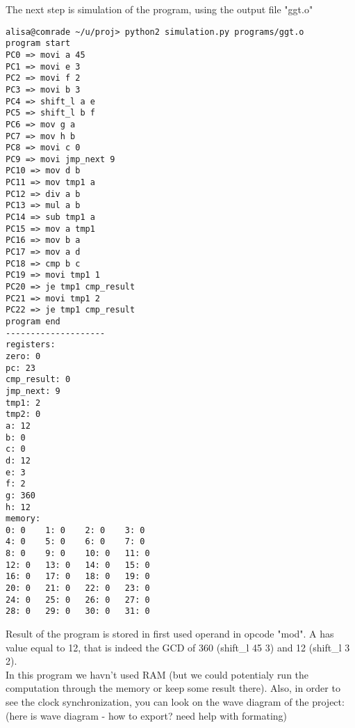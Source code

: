 \documentclass[11pt,a4paper]{article}
\begin{document}
The next step is simulation of the program, using the output file "ggt.o"
\begin{verbatim}
alisa@comrade ~/u/proj> python2 simulation.py programs/ggt.o
program start
PC0 => movi a 45
PC1 => movi e 3
PC2 => movi f 2
PC3 => movi b 3
PC4 => shift_l a e
PC5 => shift_l b f
PC6 => mov g a
PC7 => mov h b
PC8 => movi c 0
PC9 => movi jmp_next 9
PC10 => mov d b
PC11 => mov tmp1 a
PC12 => div a b
PC13 => mul a b
PC14 => sub tmp1 a
PC15 => mov a tmp1
PC16 => mov b a
PC17 => mov a d
PC18 => cmp b c
PC19 => movi tmp1 1
PC20 => je tmp1 cmp_result
PC21 => movi tmp1 2
PC22 => je tmp1 cmp_result
program end
--------------------
registers:
zero: 0
pc: 23
cmp_result: 0
jmp_next: 9
tmp1: 2
tmp2: 0
a: 12
b: 0
c: 0
d: 12
e: 3
f: 2
g: 360
h: 12
memory:
0: 0    1: 0    2: 0    3: 0
4: 0    5: 0    6: 0    7: 0
8: 0    9: 0    10: 0   11: 0
12: 0   13: 0   14: 0   15: 0
16: 0   17: 0   18: 0   19: 0
20: 0   21: 0   22: 0   23: 0
24: 0   25: 0   26: 0   27: 0
28: 0   29: 0   30: 0   31: 0
\end{verbatim}
Result of the program is stored in first used operand in opcode "mod". A has value equal to 12, that is indeed the GCD of 360 (shift\_l 45 3) and 12 (shift\_l 3 2).\\
In this program we havn't used RAM (but we could potentialy run the computation through the memory or keep some result there).
Also, in order to see the clock synchronization, you can look on the wave diagram of the project:\\
			(here is wave diagram - how to export? need help with formating)
\newpage
\end{document}
